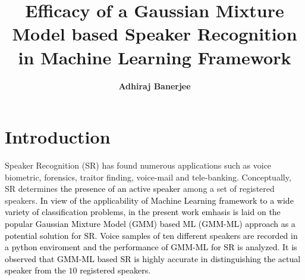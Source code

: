 \documentclass{article}
\title{\textbf{Efficacy of a Gaussian Mixture Model based Speaker Recognition in Machine Learning Framework}}
\author{\textbf{Adhiraj Banerjee}}
\begin{document}
\maketitle

\section{\textbf{{Introduction}}}
Speaker Recognition (SR) has found numerous applications such as voice biometric, forensics, traitor finding, voice-mail and  tele-banking. Conceptually, SR determines \textcolor{black}{the presence of an active speaker} among a set of registered speakers. %
 \textcolor{black}{In view of the applicability of {Machine Learning} framework to a wide variety of classification problems, in the present work emhasis is laid on the popular Gaussian Mixture Model (GMM) based ML (GMM-ML) approach as a potential solution for SR. Voice samples of ten different speakers are recorded in a python enviroment and the performance of GMM-ML for SR is analyzed. It is observed that GMM-ML based SR is highly accurate in distinguishing the actual speaker from the $10$ registered speakers.}
\end{document}
